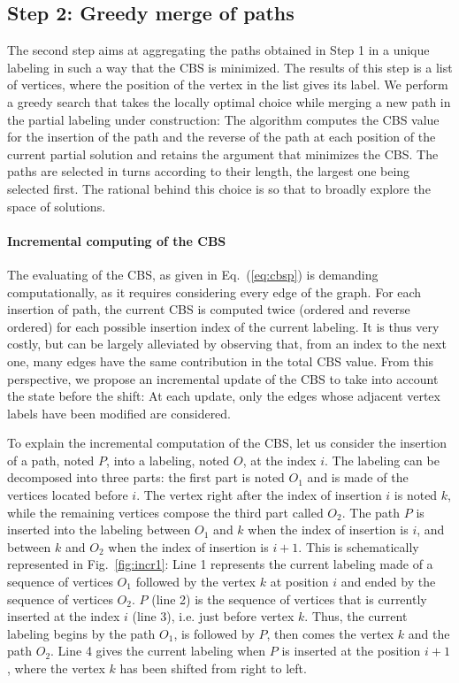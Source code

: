\documentclass{scrartcl}
\theoremstyle{plain}
\newcommand{\cbs}{CBS}
\begin{document}
\subsection{Step 2: Greedy merge of paths}
\label{subsec:step2}

The second step aims at aggregating the paths obtained in Step 1 in a unique 
labeling in such a way that the CBS is minimized. The results of this step is a 
list of vertices, where the position of the vertex in the list gives its label. 
We perform a greedy search that takes the locally optimal choice while merging a 
new path in the partial labeling under construction: The algorithm computes the 
\cbs{} value for the insertion of the path and the reverse of the path at each 
position of the current partial solution and retains the argument that minimizes 
the \cbs{}. The paths are selected in turns according to their length, the 
largest one being selected first. The rational behind this choice is so that to 
broadly explore the space of solutions.



\paragraph{Incremental computing of the CBS}

The evaluating of the \cbs{}, as given in Eq.~(\ref{eq:cbsp}) is demanding 
computationally, as it requires considering every edge of the graph. For each 
insertion of path,  the current \cbs{} is computed twice (ordered and reverse 
ordered) for each possible insertion index of the current labeling. It is thus 
very costly, but can be largely alleviated by observing that, from an index to 
the next one, many edges have the same contribution in the total \cbs{} value. 
From this perspective, we propose an incremental update of the \cbs{} to take 
into account the state before the shift: At each update, only the edges whose 
adjacent vertex labels have been modified are considered.

To explain the incremental computation of the \cbs{}, let us consider the 
insertion of a path, noted $P$, into a labeling, noted $O$, at the index $i$. 
The labeling can be decomposed into three parts: the first part is noted $O_1$ 
and is made of the vertices located before $i$. The vertex right after the index 
of insertion $i$ is noted $k$, while the remaining vertices compose the third 
part called $O_2$. The path $P$ is inserted into the labeling between $O_1$ and 
$k$ when the index of insertion is $i$, and between $k$ and $O_2$ when the index 
of insertion is $i+1$. This is schematically represented in 
Fig.~\ref{fig:incr1}: Line 1 represents the current labeling made of a sequence 
of vertices $O_1$ followed by the vertex $k$ at position $i$ and ended by the 
sequence of vertices $O_2$. $P$ (line 2) is the sequence of vertices that is 
currently inserted at the index $i$ (line 3), i.e. just before vertex $k$. Thus, 
the current labeling begins by the path $O_1$, is followed by $P$, then comes 
the vertex $k$ and the path $O_2$. Line 4 gives the current labeling when $P$ is 
inserted at the position $i+1$, where the vertex $k$ has been shifted from right 
to left. 
\end{document}
